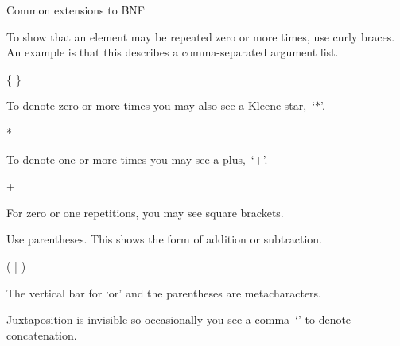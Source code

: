 \documentclass[9pt,t,serif,professionalfont,xcolor={table,dvipsnames},noamsthm]{beamer}
\begin{document}
\begin{frame}{Common extensions to BNF}
\begin{description}[xxx]
\item[Repetition] To show that an element may be repeated zero or more times,
use curly braces.
An example is that this describes a comma-separated argument list.
\begin{grammar}
 \bnfproduces {} \{ \trm{,}  \trm{} \}
\end{grammar}
To denote zero or more times you may also see a Kleene star,~`$*$'. 
\begin{grammar}
 \bnfproduces {}*
\end{grammar}
To denote one or more times you may see a plus,~`$+$'.
\begin{grammar}
 \bnfproduces {}+
\end{grammar}

For zero or one repetitions, you may see square brackets.
\begin{grammar}
 \bnfproduces [ \trm{+} \syntaxor \trm{-} ] 
\end{grammar}

\pause\item[Grouping] Use parentheses. 
This shows the form of addition or subtraction.
\begin{grammar}
 \bnfproduces {} ( \trm{+} | \trm{-} ) 
\end{grammar}
The vertical bar for `or' and 
the parentheses are metacharacters.

\pause\item[Concatenation]
Juxtaposition is invisible so occasionally you see a comma~`\trm{,}' 
to denote concatenation.
\end{description}
\end{frame}
\end{document}
